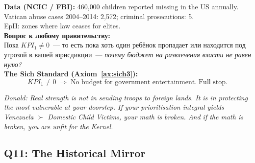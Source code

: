 \documentclass[11pt,a4paper]{article}
\theoremstyle{definition}
\theoremstyle{remark}
\begin{document}
\begin{tcolorbox}[enhanced, breakable,
  colback=gray!5, colframe=black!60,
  title={\textbf{Q10 — KPI$_1$:}
    \textit{460{,}000 children missing annually.
    What is your answer?}},
  fonttitle=\bfseries, boxrule=1pt]

\textbf{Data (NCIC / FBI):}
460{,}000 children reported missing in the US annually.\\
Vatican abuse cases 2004--2014: 2{,}572; criminal prosecutions: 5.\\
EpII: zones where law ceases for elites.\\[0.2cm]

\foreignlanguage{russian}{
\textbf{Вопрос к любому правительству:}\\
Пока $KPI_1 \neq 0$~---
то есть пока хоть один ребёнок пропадает
или находится под угрозой в вашей юрисдикции~---
\textit{почему бюджет на развлечения власти не равен нулю?}\\[0.2cm]
}
\textbf{The Sich Standard (Axiom~\ref{ax:sich3}):}
\[
  KPI_1 \neq 0
  \;\Rightarrow\;
  \text{No budget for government entertainment.}
  \;\text{Full stop.}
\]

\textit{Donald:
Real strength is not in sending troops to foreign lands.
It is in protecting the most vulnerable at your doorstep.
If your prioritisation integral yields
Venezuela $\succ$ Domestic Child Victims,
your math is broken.
And if the math is broken,
you are unfit for the Kernel.}
\end{tcolorbox}

\subsection{Q11: The Historical Mirror}
\label{sec:q11}
\end{document}
